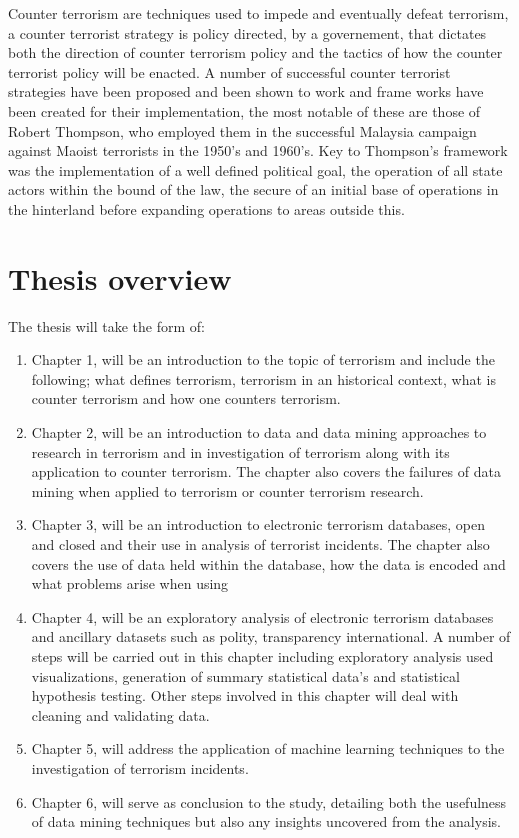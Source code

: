 Counter terrorism are techniques used to impede and eventually defeat terrorism, a counter terrorist strategy is policy directed, by a governement, that dictates both the direction of counter terrorism policy and the tactics of how the counter terrorist policy will be enacted. A number of successful counter terrorist strategies have been proposed and been shown to work and frame works have been created for their implementation, the most notable of these are those of Robert Thompson, who employed them in the successful Malaysia campaign against Maoist terrorists in the 1950's and 1960's. Key to Thompson's framework was the implementation of a well defined political goal, the operation of all state actors within the bound of the law, the secure of an initial base of operations in the hinterland before expanding operations to areas outside this.

\section{Thesis overview}
The thesis will take the form of:
\begin{enumerate}
\item Chapter 1, will be an introduction to the topic of terrorism and include the following; what defines terrorism, terrorism in an historical context, what is counter terrorism and how one counters terrorism.
\item Chapter 2, will be an introduction to data and data mining approaches to research in terrorism and in investigation of terrorism along with its application to counter terrorism. The chapter also covers the failures of data mining when applied to terrorism or counter terrorism research.
\item Chapter 3, will be an introduction to electronic terrorism databases, open and closed and their use in analysis of terrorist incidents. The chapter also covers the use of data held within the database, how the data is encoded and what problems arise when using 
\item Chapter 4, will be an exploratory analysis of electronic terrorism databases and ancillary datasets such as polity, transparency international. A number of steps will be carried out in this chapter including exploratory analysis used visualizations, generation of summary statistical data's and statistical hypothesis testing. Other steps involved in this chapter will deal with cleaning and validating data. 
\item Chapter 5, will address the application of machine learning techniques to the investigation of terrorism incidents.
\item Chapter 6, will serve as conclusion to the study, detailing both the usefulness of data mining techniques but also any insights uncovered from the analysis.
\end{enumerate}
